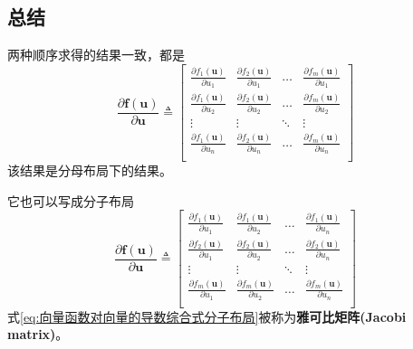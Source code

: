 \documentclass[withoutpreface,bwprint]{NoteBook}
\begin{document}
\subsection{总结}
两种顺序求得的结果一致，都是
\begin{equation}
    \label{eq:向量函数对向量的导数综合式分母布局}
    \frac{\partial \mathbf{f}(\mathbf{u})}{\partial \mathbf{u}} 
    \triangleq  
    \begin{bmatrix}
        \frac{\partial f_1(\mathbf{u})}{\partial u_1} & \frac{\partial f_2(\mathbf{u})}{\partial u_1} & \dots & \frac{\partial f_m(\mathbf{u})}{\partial u_1} \\
        \frac{\partial f_1(\mathbf{u})}{\partial u_2} & \frac{\partial f_2(\mathbf{u})}{\partial u_2} & \dots & \frac{\partial f_m(\mathbf{u})}{\partial u_2} \\
        \vdots                                        & \vdots                                        & \ddots & \vdots \\
        \frac{\partial f_1(\mathbf{u})}{\partial u_n} & \frac{\partial f_2(\mathbf{u})}{\partial u_n} & \dots &  \frac{\partial f_m(\mathbf{u})}{\partial u_n}\\
    \end{bmatrix}
\end{equation}
该结果是分母布局下的结果。

它也可以写成分子布局
\begin{equation}
    \label{eq:向量函数对向量的导数综合式分子布局}
    \frac{\partial \mathbf{f}(\mathbf{u})}{\partial \mathbf{u}} 
    \triangleq  
    \begin{bmatrix}
        \frac{\partial f_1(\mathbf{u})}{\partial u_1} & \frac{\partial f_1(\mathbf{u})}{\partial u_2} & \dots & \frac{\partial f_1(\mathbf{u})}{\partial u_n} \\
        \frac{\partial f_2(\mathbf{u})}{\partial u_1} & \frac{\partial f_2(\mathbf{u})}{\partial u_2} & \dots & \frac{\partial f_2(\mathbf{u})}{\partial u_n} \\
        \vdots                                        & \vdots                                        & \ddots & \vdots \\
        \frac{\partial f_m(\mathbf{u})}{\partial u_1} & \frac{\partial f_m(\mathbf{u})}{\partial u_2} & \dots &  \frac{\partial f_m(\mathbf{u})}{\partial u_n}\\
    \end{bmatrix}
\end{equation}
式\cref{eq:向量函数对向量的导数综合式分子布局}被称为\textbf{雅可比矩阵(Jacobi matrix)}。
\end{document}
